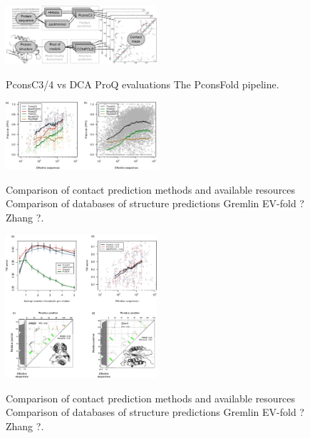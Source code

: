 \documentclass[a4,center,fleqn]{NAR}
\begin{document}
\begin{figure}[t]
\begin{center}
\end{center}
\caption{PconsC3/4 vs DCA
ProQ evaluations 
The PconsFold pipeline.}
    \includegraphics[width=0.5\textwidth]{figures/flowchart.eps}
\label{fig:Pipeline}
\end{figure}


\begin{figure}[t]
\begin{center}
\end{center}
\caption{Comparison of contact prediction methods and available resources
Comparison of databases of structure predictions
Gremlin
EV-fold ?
Zhang ?.}
    \includegraphics[width=0.5\textwidth]{figures/fig1_PNAS.eps}
\label{fig:comparison}

\end{figure}
\begin{figure}[t]
\begin{center}
\end{center}
\caption{Comparison of contact prediction methods and available resources
Comparison of databases of structure predictions
Gremlin
EV-fold ?
Zhang ?.}
    \includegraphics[width=0.5\textwidth]{figures/fig4_PNAS.eps}
\label{fig:comparison}
\end{figure}
\end{document}
